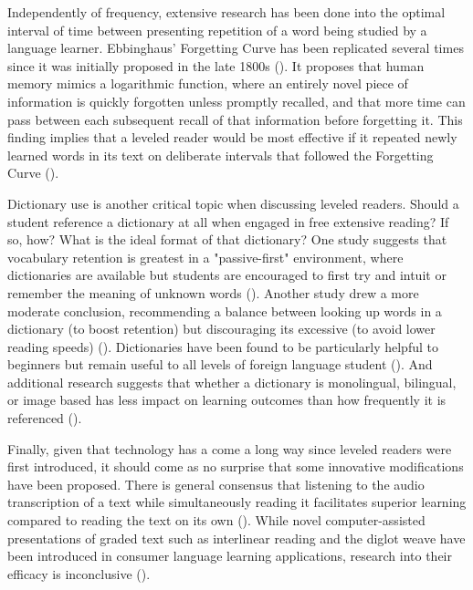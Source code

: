 \documentclass[
	letterpaper, %
]{jdf}
\newcommand{\pcite}[1]{(\cite{#1})}
\begin{document}
Independently of frequency, extensive research has been done into the optimal interval of time between presenting repetition of a word being studied by a language learner. Ebbinghaus' Forgetting Curve has been replicated several times since it was initially proposed in the late 1800s \pcite{Murre2015ReplicationAA}. It proposes that human memory mimics a logarithmic function, where an entirely novel piece of information is quickly forgotten unless promptly recalled, and that more time can pass between each subsequent recall of that information before forgetting it. This finding implies that a leveled reader would be most effective if it repeated newly learned words in its text on deliberate intervals that followed the Forgetting Curve \pcite{shortestpathrepetitionscheduling}.

Dictionary use is another critical topic when discussing leveled readers. Should a student reference a dictionary at all when engaged in free extensive reading? If so, how? What is the ideal format of that dictionary? One study suggests that vocabulary retention is greatest in a "passive-first" environment, where dictionaries are available but students are encouraged to first try and intuit or remember the meaning of unknown words \pcite{mcdonald2016}. Another study drew a more moderate conclusion, recommending a balance between looking up words in a dictionary (to boost retention) but discouraging its excessive (to avoid lower reading speeds) \pcite{dictionaryimportance}. Dictionaries have been found to be particularly helpful to beginners but remain useful to all levels of foreign language student \pcite{dictionaryvalue}. And additional research suggests that whether a dictionary is monolingual, bilingual, or image based has less impact on learning outcomes than how frequently it is referenced \pcite{dictionarypitfalls, imagesdictionary, bilingual_dictionary}.

Finally, given that technology has a come a long way since leveled readers were first introduced, it should come as no surprise that some innovative modifications have been proposed. There is general consensus that listening to the audio transcription of a text while simultaneously reading it facilitates superior learning compared to reading the text on its own \pcite{Chang2015ImprovingRR}. While novel computer-assisted presentations of graded text such as interlinear reading and the diglot weave have been introduced in consumer language learning applications, research into their efficacy is inconclusive \pcite{hyplern_interlinear_reading, diglot_weave}.
\end{document}
